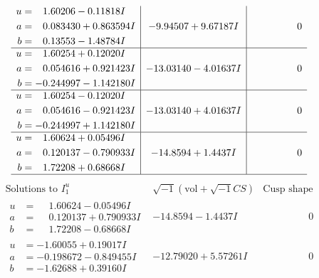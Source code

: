 \documentclass[1p]{elsarticle_modified}
\theoremstyle{definition}
\newcommand{\I}{\sqrt{-1}}
\begin{document}
$$\begin{array}{c|c|c}
\begin{aligned}
u &= \phantom{-}1.60206 - 0.11818 I \\
a &= \phantom{-}0.083430 + 0.863594 I \\
b &= \phantom{-}0.13553 - 1.48784 I\end{aligned}
 & -9.94507 + 9.67187 I & \phantom{-0.000000 } 0 \\ \hline\begin{aligned}
u &= \phantom{-}1.60254 + 0.12020 I \\
a &= \phantom{-}0.054616 + 0.921423 I \\
b &= -0.244997 - 1.142180 I\end{aligned}
 & -13.03140 - 4.01637 I & \phantom{-0.000000 } 0 \\ \hline\begin{aligned}
u &= \phantom{-}1.60254 - 0.12020 I \\
a &= \phantom{-}0.054616 - 0.921423 I \\
b &= -0.244997 + 1.142180 I\end{aligned}
 & -13.03140 + 4.01637 I & \phantom{-0.000000 } 0 \\ \hline\begin{aligned}
u &= \phantom{-}1.60624 + 0.05496 I \\
a &= \phantom{-}0.120137 - 0.790933 I \\
b &= \phantom{-}1.72208 + 0.68668 I\end{aligned}
 & -14.8594 + 1.4437 I & \phantom{-0.000000 } 0\\
 \hline 
 \end{array}$$\newpage$$\begin{array}{c|c|c}  
\text{Solutions to }I^u_{1}& \I (\text{vol} + \sqrt{-1}CS) & \text{Cusp shape}\\
 \hline 
\begin{aligned}
u &= \phantom{-}1.60624 - 0.05496 I \\
a &= \phantom{-}0.120137 + 0.790933 I \\
b &= \phantom{-}1.72208 - 0.68668 I\end{aligned}
 & -14.8594 - 1.4437 I & \phantom{-0.000000 } 0 \\ \hline\begin{aligned}
u &= -1.60055 + 0.19017 I \\
a &= -0.198672 - 0.849455 I \\
b &= -1.62688 + 0.39160 I\end{aligned}
 & -12.79020 + 5.57261 I & \phantom{-0.000000 } 0 \\ \hline\begin{aligned}

\end{aligned}
\end{array}$$
\end{document}
